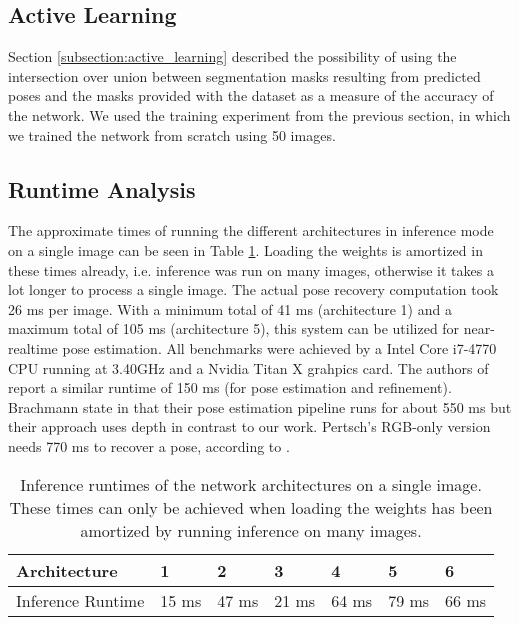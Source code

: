 
\subsection{Active Learning} \label{subsection:experiments_active_learning}

Section \ref{subsection:active_learning} described the possibility of using the intersection over union between segmentation masks resulting from predicted poses and the masks provided with the dataset as a measure of the accuracy of the network. We used the training experiment from the previous section, in which we trained the network from scratch using 50 images. 

\subsection{Runtime Analysis}

The approximate times of running the different architectures in inference mode on a single image can be seen in Table \ref{table:network_runtimes}. Loading the weights is amortized in these times already, i.e. inference was run on many images, otherwise it takes a lot longer to process a single image. The actual pose recovery computation took 26 ms per image. With a minimum total of 41 ms (architecture 1) and a maximum total of 105 ms (architecture 5), this system can be utilized for near-realtime pose estimation. All benchmarks were achieved by a Intel Core i7-4770 CPU running at 3.40GHz and a Nvidia Titan X grahpics card. The authors of \cite{bb8} report a similar runtime of 150 ms (for pose estimation and refinement). Brachmann \etal state in \cite{brachmann1} that their pose estimation pipeline runs for about 550 ms but their approach uses depth in contrast to our work. Pertsch's RGB-only version needs 770 ms to recover a pose, according to \cite{pertsch}.

\begin{table}[b]
\centering
\begin{tabular}{|l||llllll|}
\hline
Architecture      & 1     & 2     & 3     & 4     & 5     & 6     \\ \hline \hline \rowcolor{Gray}
Inference Runtime & 15 ms & 47 ms & 21 ms & 64 ms & 79 ms & 66 ms \\  \hline  
\end{tabular}
\caption{Inference runtimes of the network architectures on a single image. These times can only be achieved when loading the weights has been amortized by running inference on many images.}
\label{table:network_runtimes}
\end{table}

